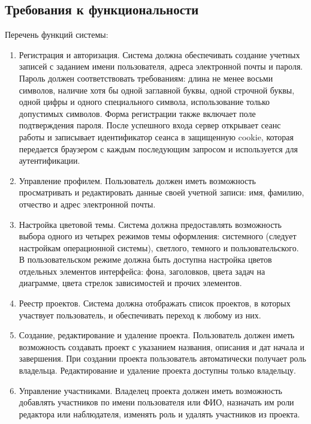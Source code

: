 \subsection{Требования к функциональности}

Перечень функций системы:

\begin{enumerate}
    \item Регистрация и авторизация. Система должна обеспечивать создание учетных записей с заданием имени пользователя, адреса электронной почты и пароля. Пароль должен соответствовать требованиям: длина не менее восьми символов, наличие хотя бы одной заглавной буквы, одной строчной буквы, одной цифры и одного специального символа, использование только допустимых символов. Форма регистрации также включает поле подтверждения пароля. После успешного входа сервер открывает сеанс работы и записывает идентификатор сеанса в защищенную cookie, которая передается браузером с каждым последующим запросом и используется для аутентификации.

    \item Управление профилем. Пользователь должен иметь возможность просматривать и редактировать данные своей учетной записи: имя, фамилию, отчество и адрес электронной почты.

    \item Настройка цветовой темы. Система должна предоставлять возможность выбора одного из четырех режимов темы оформления: системного (следует настройкам операционной системы), светлого, темного и пользовательского. В пользовательском режиме должна быть доступна настройка цветов отдельных элементов интерфейса: фона, заголовков, цвета задач на диаграмме, цвета стрелок зависимостей и прочих элементов.

    \item Реестр проектов. Система должна отображать список проектов, в которых участвует пользователь, и обеспечивать переход к любому из них.

    \item Создание, редактирование и удаление проекта. Пользователь должен иметь возможность создавать проект с указанием названия, описания и дат начала и завершения. При создании проекта пользователь автоматически получает роль владельца. Редактирование и удаление проекта доступны только владельцу.

    \item Управление участниками. Владелец проекта должен иметь возможность добавлять участников по имени пользователя или ФИО, назначать им роли редактора или наблюдателя, изменять роль и удалять участников из проекта.


\end{enumerate}
